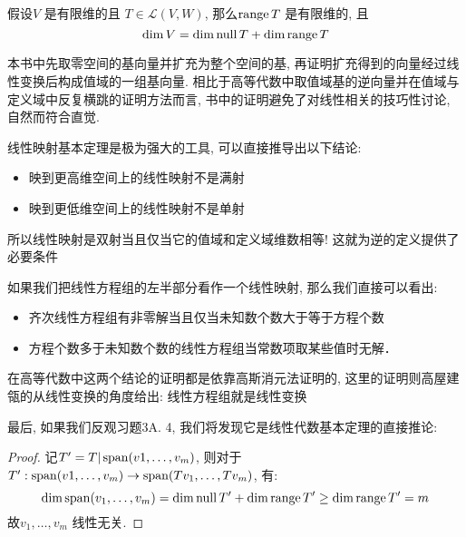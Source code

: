 \begin{theorem}
    假设\(V\) 是有限维的且 \(T \in \mathscr{L}(V,W)\), 那么\(\operatorname{range}
    T\) 是有限维的, 且\[
        \dim V = \dim \operatorname{null} T + \dim \operatorname{range} T
    \]
\end{theorem}

本书中先取零空间的基向量并扩充为整个空间的基, 再证明扩充得到的向量经过线性变换后构成值域的一组基向量.
相比于高等代数中取值域基的逆向量并在值域与定义域中反复横跳的证明方法而言, 书中的证明避免了对线性相关的技巧性讨论, 自然而符合直觉.

线性映射基本定理是极为强大的工具, 可以直接推导出以下结论:

\begin{itemize}
    \item 映到更高维空间上的线性映射不是满射
    \item 映到更低维空间上的线性映射不是单射
\end{itemize}
所以线性映射是双射当且仅当它的值域和定义域维数相等! 这就为逆的定义提供了必要条件

如果我们把线性方程组的左半部分看作一个线性映射, 那么我们直接可以看出:
\begin{itemize}
    \item 齐次线性方程组有非零解当且仅当未知数个数大于等于方程个数
    \item 方程个数多于未知数个数的线性方程组当常数项取某些值时无解．
\end{itemize}

在高等代数中这两个结论的证明都是依靠高斯消元法证明的, 这里的证明则高屋建瓴的从线性变换的角度给出: 线性方程组就是线性变换

最后, 如果我们反观习题3A. 4, 我们将发现它是线性代数基本定理的直接推论:
\begin{proof}
    记\(T^{\prime}= T|\operatorname{span}(v1, \dots, v_{m})\),
    则对于\(T^{\prime}: \operatorname{span}(v1, \dots, v_{m}) \to
    \operatorname{span}(Tv_{1}, \dots, Tv_{m})\), 有:
    \[
        \dim \operatorname{span}(v_{1}, \dots, v_{m}) = \dim \operatorname{null} T^{\prime} +
        \dim \operatorname{range} T^{\prime} \geq \dim \operatorname{range} T^{\prime} = m
    \]
    故\(v_{1}, \dots, v_{m}\) 线性无关.
\end{proof}
